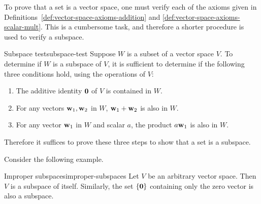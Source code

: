 To prove that a set is a vector space, one must verify each of the
axioms given in Definitions~\ref{def:vector-space-axioms-addition} and
{\ref{def:vector-space-axioms-scalar-mult}}. This is a cumbersome
task, and therefore a shorter procedure is used to verify a subspace.

\begin{procedure}{Subspace test}{subspace-test}
  Suppose $W$ is a subset of a vector space $V$. To determine if $W$
  is a subspace of $V$, it is sufficient to determine if the following
  three conditions hold, using the operations of $V$:
  \begin{enumerate}
  \item The additive identity $\mbox{\bf 0}$ of $V$ is contained in $W$.
  \item For any vectors $\mbox{\bf w}_1, \mbox{\bf w}_2$ in $W$,
    $\mbox{\bf w}_1 + \mbox{\bf w}_2$ is also in $W$.
  \item For any vector $\mbox{\bf w}_1$ in $W$ and scalar $a$, the product
    $a\mbox{\bf w}_1$ is also in $W$.
  \end{enumerate}
\end{procedure}

Therefore it suffices to prove these three steps to show that a set is
a subspace.

Consider the following example.

\begin{example}{Improper subspaces}{improper-subspaces}
  Let $V$ be an arbitrary vector space. Then $V$ is a subspace of
  itself. Similarly, the set $\left\{\mbox{\bf 0} \right\}$ containing only the
  zero vector is also a subspace.
\end{example}

